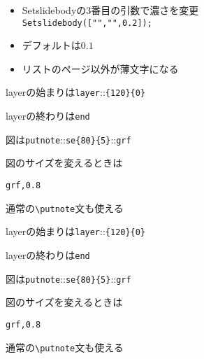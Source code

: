 \documentclass[landscape,10pt]{ujarticle}
\def\setthin#1{\def\thin{#1}}
\begin{document}
\sameslide

\vspace*{18mm}

\begin{itemize}
\item
Setslidebodyの3番目の引数で濃さを変更\\
\hspace*{10mm}\verb|Setslidebody(["","",0.2]);|
\item
デフォルトは$0.1$
\item
リストのページ以外が薄文字になる
\end{itemize}


\vspace*{18mm}

\setthin{0}
\begin{itemize}
\item
layerの始まりは\verb+layer+{:}{:}\verb+{120}{0}+
{\color[cmyk]{\thin,\thin,\thin,\thin}
\item
layerの終わりは\verb|end|
}%
{\color[cmyk]{\thin,\thin,\thin,\thin}
\item
図は\verb+putnote+{:}{:}\verb+se{80}{5}+{:}{:}\verb+grf+
}%
{\color[cmyk]{\thin,\thin,\thin,\thin}
\item
図のサイズを変えるときは\\
}%
{\color[cmyk]{\thin,\thin,\thin,\thin}
\hspace*{10mm}{:}{:}\verb+grf,0.8+
}%
{\color[cmyk]{\thin,\thin,\thin,\thin}
\item
通常の\verb|\putnote|文も使える
}%
\end{itemize}



\sameslide

\vspace*{18mm}

\setthin{0}
\begin{itemize}
\item
layerの始まりは\verb+layer+{:}{:}\verb+{120}{0}+
\item
layerの終わりは\verb|end|
{\color[cmyk]{\thin,\thin,\thin,\thin}
\item
図は\verb+putnote+{:}{:}\verb+se{80}{5}+{:}{:}\verb+grf+
}%
{\color[cmyk]{\thin,\thin,\thin,\thin}
\item
図のサイズを変えるときは\\
}%
{\color[cmyk]{\thin,\thin,\thin,\thin}
\hspace*{10mm}{:}{:}\verb+grf,0.8+
}%
{\color[cmyk]{\thin,\thin,\thin,\thin}
\item
通常の\verb|\putnote|文も使える
}%
\end{itemize}
\end{document}
